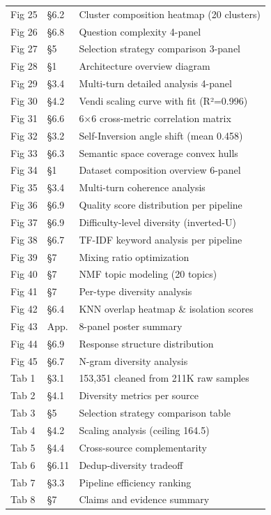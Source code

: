 \begin{table}[t]
\begin{tabular}{llp{7cm}}
Fig 25 & §6.2 & Cluster composition heatmap (20 clusters) \\
Fig 26 & §6.8 & Question complexity 4-panel \\
Fig 27 & §5 & Selection strategy comparison 3-panel \\
Fig 28 & §1 & Architecture overview diagram \\
Fig 29 & §3.4 & Multi-turn detailed analysis 4-panel \\
Fig 30 & §4.2 & Vendi scaling curve with fit (R²=0.996) \\
Fig 31 & §6.6 & 6×6 cross-metric correlation matrix \\
Fig 32 & §3.2 & Self-Inversion angle shift (mean 0.458) \\
Fig 33 & §6.3 & Semantic space coverage convex hulls \\
Fig 34 & §1 & Dataset composition overview 6-panel \\
Fig 35 & §3.4 & Multi-turn coherence analysis \\
Fig 36 & §6.9 & Quality score distribution per pipeline \\
Fig 37 & §6.9 & Difficulty-level diversity (inverted-U) \\
Fig 38 & §6.7 & TF-IDF keyword analysis per pipeline \\
Fig 39 & §7 & Mixing ratio optimization \\
Fig 40 & §7 & NMF topic modeling (20 topics) \\
Fig 41 & §7 & Per-type diversity analysis \\
Fig 42 & §6.4 & KNN overlap heatmap \& isolation scores \\
Fig 43 & App. & 8-panel poster summary \\
Fig 44 & §6.9 & Response structure distribution \\
Fig 45 & §6.7 & N-gram diversity analysis \\
\midrule
Tab 1 & §3.1 & 153,351 cleaned from 211K raw samples \\
Tab 2 & §4.1 & Diversity metrics per source \\
Tab 3 & §5 & Selection strategy comparison table \\
Tab 4 & §4.2 & Scaling analysis (ceiling 164.5) \\
Tab 5 & §4.4 & Cross-source complementarity \\
Tab 6 & §6.11 & Dedup-diversity tradeoff \\
Tab 7 & §3.3 & Pipeline efficiency ranking \\
Tab 8 & §7 & Claims and evidence summary \\

\end{tabular}
\end{table}
